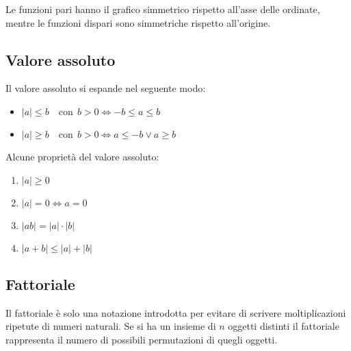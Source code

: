 Le funzioni pari hanno il grafico simmetrico rispetto all'asse delle ordinate, 
mentre le funzioni dispari sono simmetriche rispetto all'origine.

\subsection{Valore assoluto}


Il valore assoluto si espande nel seguente modo:
\begin{itemize}
    \item $|a| \leq b \quad \mathrm{con}\;\, b > 0 \iff -b \leq a \leq b$
    \item $|a| \geq b \quad \mathrm{con}\;\, b > 0 \iff a \leq -b \lor a 
        \geq b$
\end{itemize}
Alcune proprietà del valore assoluto:
\begin{enumerate}
    \item $|a| \geq 0$
    \item $|a| = 0 \iff a = 0$
    \item $|ab| = |a| \cdot |b|$
    \item $|a + b| \leq |a| + |b|$
\end{enumerate}

\subsection{Fattoriale}
Il fattoriale è solo una notazione introdotta per evitare di scrivere 
moltiplicazioni ripetute di numeri naturali. Se si ha un insieme di $n$ oggetti 
distinti il fattoriale rappresenta il numero di possibili permutazioni di 
quegli oggetti.

